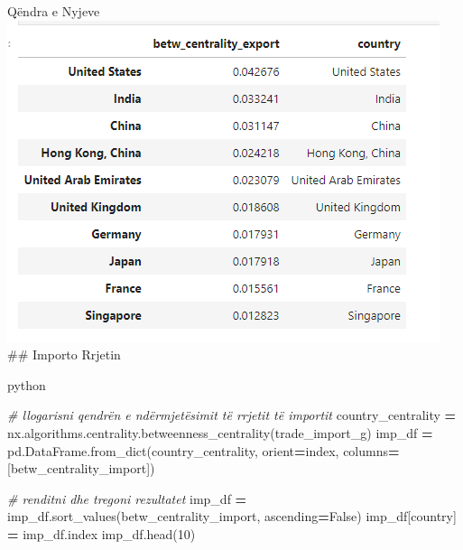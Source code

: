 \documentclass[
  ignorenonframetext,
]{beamer}
\newenvironment{Shaded}{\begin{snugshade}}{\end{snugshade}}
\newcommand{\CommentTok}[1]{\textcolor[rgb]{0.56,0.35,0.01}{\textit{#1}}}
\newcommand{\DecValTok}[1]{\textcolor[rgb]{0.00,0.00,0.81}{#1}}
\newcommand{\NormalTok}[1]{#1}
\newcommand{\OperatorTok}[1]{\textcolor[rgb]{0.81,0.36,0.00}{\textbf{#1}}}
\newcommand{\StringTok}[1]{\textcolor[rgb]{0.31,0.60,0.02}{#1}}
\newcommand{\VariableTok}[1]{\textcolor[rgb]{0.00,0.00,0.00}{#1}}
\begin{document}
\begin{frame}[fragile]{Qëndra e Nyjeve}
\protect\hypertarget{quxebndra-e-nyjeve-2}{}
\includegraphics{./Figs/qnyje.png} \#\# Importo Rrjetin

python

\begin{Shaded}
\begin{Highlighting}[]
\CommentTok{\# llogarisni qendrën e ndërmjetësimit të rrjetit të importit}
\NormalTok{country\_centrality }\OperatorTok{=}\NormalTok{ nx.algorithms.centrality.betweenness\_centrality(trade\_import\_g)}
\NormalTok{imp\_df }\OperatorTok{=}\NormalTok{ pd.DataFrame.from\_dict(country\_centrality, }
\NormalTok{                            orient}\OperatorTok{=}\StringTok{\textquotesingle{}index\textquotesingle{}}\NormalTok{, columns}\OperatorTok{=}\NormalTok{[}\StringTok{\textquotesingle{}betw\_centrality\_import\textquotesingle{}}\NormalTok{])}

\CommentTok{\# renditni dhe tregoni rezultatet}
\NormalTok{imp\_df }\OperatorTok{=}\NormalTok{ imp\_df.sort\_values(}\StringTok{\textquotesingle{}betw\_centrality\_import\textquotesingle{}}\NormalTok{, ascending}\OperatorTok{=}\VariableTok{False}\NormalTok{)}
\NormalTok{imp\_df[}\StringTok{\textquotesingle{}country\textquotesingle{}}\NormalTok{] }\OperatorTok{=}\NormalTok{ imp\_df.index}
\NormalTok{imp\_df.head(}\DecValTok{10}\NormalTok{)}
\end{Highlighting}
\end{Shaded}
\end{frame}
\end{document}
